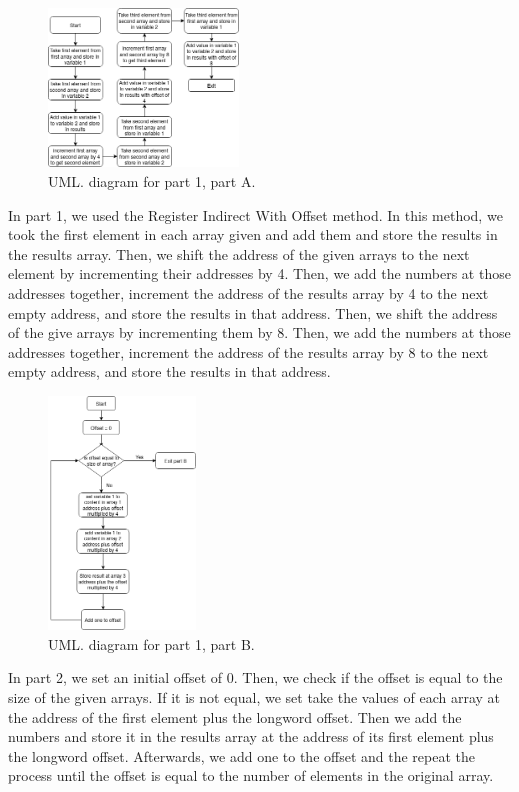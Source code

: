 \documentclass[10pt, letterpaper, titlepage]{article} %
\begin{document}
\begin{multicols*}{2}
\begin{figure}[H]
   \includegraphics[width=0.45\textwidth]{part1a.png}
   \centering  
   \caption{UML. diagram for part 1, part A.} 
   \label{figure:1}
\end{figure}

In part 1, we used the Register Indirect With Offset method. 
In this method, we took the first element in each array given and add them and store the results in the results array. 
Then, we shift the address of the given arrays to the next element by incrementing their addresses by 4. 
Then, we add the numbers at those addresses together, increment the address of the results array by 4 to the next empty address, and store the results in that address. 
Then, we shift the address of the give arrays by incrementing them by 8. 
Then, we add the numbers at those addresses together, increment the address of the results array by 8 to the next empty address, and store the results in that address. 🍄🍄

\begin{figure}[H]
   \includegraphics[width=0.35\textwidth]{part1b.png}
   \centering  
   \caption{UML. diagram for part 1, part B.} 
   \label{figure:2}
\end{figure}

In part 2, we set an initial offset of 0.
Then, we check if the offset is equal to the size of the given arrays. 
If it is not equal, we set take the values of each array at the address of the first element plus the longword offset. 
Then we add the numbers and store it in the results array at the address of its first element plus the longword offset.
Afterwards, we add one to the offset and the repeat the process until the offset is equal to the number of elements in the original array. 🍄🍄


\end{multicols*}
\end{document}

